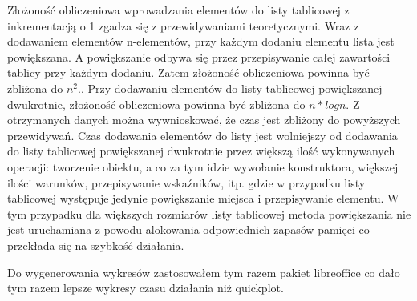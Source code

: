 \documentclass[a4paper,10pt]{scrartcl}
\begin{document}
Złożoność obliczeniowa wprowadzania elementów do listy tablicowej
z inkrementacją o 1 zgadza się z przewidywaniami teoretycznymi.
Wraz z dodawaniem elementów n-elementów, przy każdym dodaniu elementu
lista jest powiększana. A powiększanie odbywa się przez przepisywanie
całej zawartości tablicy przy każdym dodaniu. Zatem złożoność
obliczeniowa powinna być zbliżona do
\begin{math}
 n^{2}.
\end{math}.
Przy dodawaniu elementów do listy tablicowej powiększanej dwukrotnie,
złożoność obliczeniowa powinna być zbliżona do
\begin{math}
 n*log{n}
\end{math}.
Z otrzymanych danych można wywnioskować, że czas jest zbliżony do
powyższych przewidywań. Czas dodawania elementów do listy jest wolniejszy
od dodawania do listy tablicowej powiększanej dwukrotnie przez większą
ilość wykonywanych operacji: tworzenie obiektu, a co za tym idzie wywołanie
konstruktora, większej ilości warunków, przepisywanie wskaźników, itp.
gdzie w przypadku listy tablicowej występuje jedynie powiększanie miejsca
i przepisywanie elementu. W tym przypadku dla większych rozmiarów listy
tablicowej metoda powiększania nie jest uruchamiana z powodu alokowania
odpowiednich zapasów pamięci co przekłada się na szybkość działania.

Do wygenerowania wykresów zastosowałem tym razem pakiet libreoffice
co dało tym razem lepsze wykresy czasu działania niż quickplot.

\pagebreak
\end{document}
